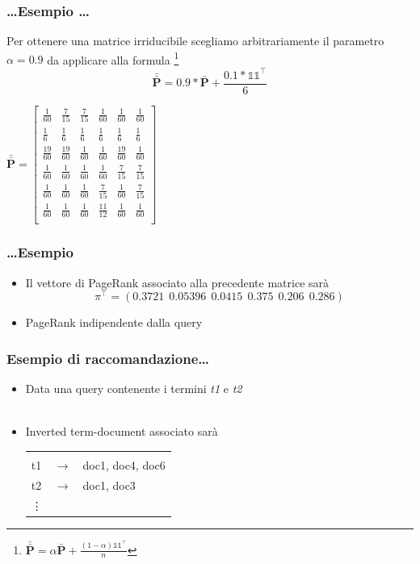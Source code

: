 \documentclass{beamer}
\begin{document}
\begin{frame}
	\frametitle{\dots Esempio \dots}
	Per ottenere una matrice irriducibile scegliamo arbitrariamente il parametro $\alpha=0.9$ da applicare alla formula \footnote{$\bar{\bar{\textbf{P}}} = \alpha\bar{\textbf{P}} + \frac{(1-\alpha)\mathbb{11}^\intercal}{n}$}
	$$\bar{\bar{\textbf{P}}} = 0.9*\bar{\textbf{P}} + \frac{0.1*\mathbb{11}^\intercal}{6}$$
	\begin{center}
		$\bar{\bar{\textbf{P}}} = \begin{bmatrix}
		\frac{1}{60} & \frac{7}{15}  & \frac{7}{15} & \frac{1}{60} &\frac{1}{60} &\frac{1}{60} \\[0.3em]
		\frac{1}{6}  & \frac{1}{6}   & \frac{1}{6}  & \frac{1}{6}  &\frac{1}{6}  &\frac{1}{6}  \\[0.3em]
		\frac{19}{60}& \frac{19}{60} & \frac{1}{60} & \frac{1}{60} &\frac{19}{60}&\frac{1}{60} \\[0.3em]
		\frac{1}{60} & \frac{1}{60}  & \frac{1}{60} & \frac{1}{60} &\frac{7}{15} &\frac{7}{15} \\[0.3em]
		\frac{1}{60} & \frac{1}{60}  & \frac{1}{60} & \frac{7}{15} &\frac{1}{60} &\frac{7}{15} \\[0.3em]
		\frac{1}{60} & \frac{1}{60}  & \frac{1}{60} & \frac{11}{12}&\frac{1}{60} &\frac{1}{60} \\[0.3em]
		\end{bmatrix}$
	\end{center}
\end{frame}
\begin{frame}
	\frametitle{\dots Esempio}
	\begin{itemize}
		\item Il vettore di PageRank associato alla precedente matrice sarà $$\pi^\intercal=(0.3721~~0.05396~~0.0415~~0.375~~0.206~~0.286)$$
		\item PageRank indipendente dalla query
	\end{itemize}
\end{frame}
\begin{frame}
	\frametitle{Esempio di raccomandazione\dots}
	\begin{itemize}
		\item Data una query contenente i termini \emph{t1} e \emph{t2} \\~\\
		\item Inverted term-document associato sarà
		\begin{center}
			\begin{tabular}{ l c l }
				&&\\
				t1 & $\longrightarrow$ & doc1, doc4, doc6 \\
				t2 & $\longrightarrow$ & doc1, doc3 \\
				\vdots & & \\
			\end{tabular}
		\end{center}
	\end{itemize}
\end{frame}
\end{document}
